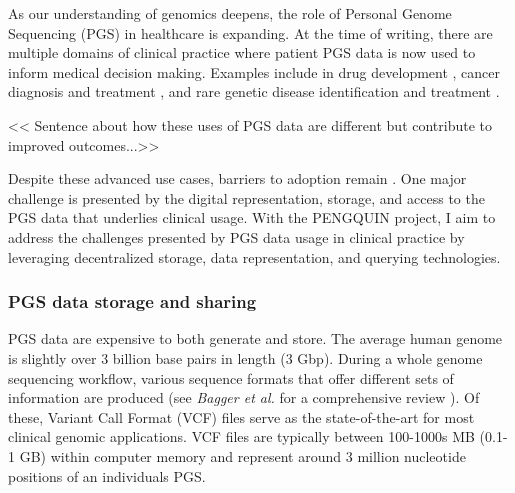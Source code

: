 \documentclass[runningheads]{llncs}
\begin{document}
As our understanding of genomics deepens, the role of Personal Genome Sequencing (PGS) in healthcare is expanding. 
At the time of writing, there are multiple domains of clinical practice where patient PGS data is now used to inform medical decision making. 
Examples include in drug development \cite{ko_new_2022}, cancer diagnosis and treatment \cite{mcleod_cancer_2013}, and rare genetic disease identification and treatment \cite{souche_recommendations_2022}.

<< Sentence about how these uses of PGS data are different but contribute to improved outcomes...>>

Despite these advanced use cases, barriers to adoption remain \cite{stefanicka-wojtas_barriers_2023}. 
One major challenge is presented by the digital representation, storage, and access to the PGS data that underlies clinical usage.
With the PENGQUIN project, I aim to address the challenges presented by PGS data usage in clinical practice by leveraging  decentralized storage, data representation, and querying technologies.  


\subsubsection{PGS data storage and sharing} 
PGS data are expensive to both generate and store. 
The average human genome is slightly over 3 billion base pairs in length (3 Gbp). 
During a whole genome sequencing workflow, various sequence formats that offer different sets of information are produced (see \textit{Bagger et al.} for a comprehensive review \cite{bagger_whole_2024} ).
Of these, Variant Call Format (VCF) files \cite{danecek_variant_2011} serve as the state-of-the-art for most clinical genomic applications.
VCF files are typically between 100-1000s MB (0.1-1 GB) within computer memory and represent around 3 million nucleotide positions of an individual\textquotesingle s PGS. 

\end{document}
